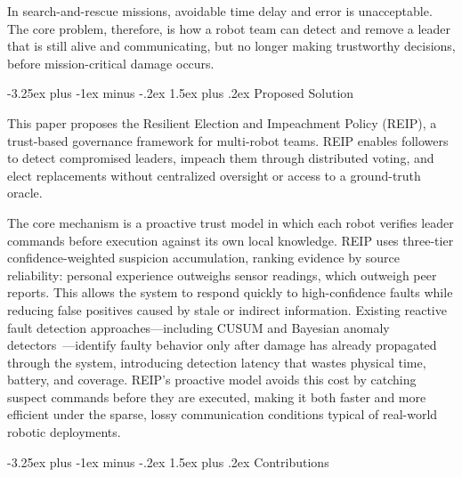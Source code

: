 \documentclass[conference]{IEEEtran}
\makeatletter
\renewcommand{\subsection}{\@startsection{subsection}{2}{\z@}%
  {-3.25ex plus -1ex minus -.2ex}%
  {1.5ex plus .2ex}%
  {\normalfont\normalsize\itshape\centering}}
\makeatother
\begin{document}
In search-and-rescue missions, avoidable time delay and error is unacceptable. The core problem, therefore, is how a robot team can detect and remove a leader that is still alive and communicating, but no longer making trustworthy decisions, before mission-critical damage occurs.

\subsection{Proposed Solution}

This paper proposes the Resilient Election and Impeachment Policy (REIP), a trust-based governance framework for multi-robot teams. REIP enables followers to detect compromised leaders, impeach them through distributed voting, and elect replacements without centralized oversight or access to a ground-truth oracle.

The core mechanism is a proactive trust model in which each robot verifies leader commands before execution against its own local knowledge. REIP uses three-tier confidence-weighted suspicion accumulation, ranking evidence by source reliability: personal experience outweighs sensor readings, which outweigh peer reports. This allows the system to respond quickly to high-confidence faults while reducing false positives caused by stale or indirect information. Existing reactive fault detection approaches---including CUSUM and Bayesian anomaly detectors~\cite{page1954cusum, gelman2013bayesian, chandola2009anomaly}---identify faulty behavior only after damage has already propagated through the system, introducing detection latency that wastes physical time, battery, and coverage. REIP's proactive model avoids this cost by catching suspect commands before they are executed, making it both faster and more efficient under the sparse, lossy communication conditions typical of real-world robotic deployments.

\subsection{Contributions}
\end{document}
